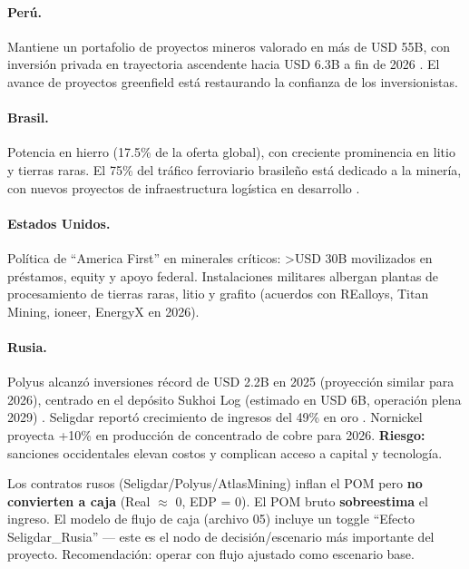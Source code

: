 \paragraph{Perú.} Mantiene un portafolio de proyectos mineros valorado en más de USD 55B, con inversión privada en trayectoria ascendente hacia USD 6.3B a fin de 2026 \cite{andina2026peru}. El avance de proyectos greenfield está restaurando la confianza de los inversionistas.

\paragraph{Brasil.} Potencia en hierro (17.5\% de la oferta global), con creciente prominencia en litio y tierras raras. El 75\% del tráfico ferroviario brasileño está dedicado a la minería, con nuevos proyectos de infraestructura logística en desarrollo \cite{bnamericas2026}.

\paragraph{Estados Unidos.} Política de ``America First'' en minerales críticos: >USD 30B movilizados en préstamos, equity y apoyo federal. Instalaciones militares albergan plantas de procesamiento de tierras raras, litio y grafito (acuerdos con REalloys, Titan Mining, ioneer, EnergyX en 2026).

\paragraph{Rusia.} Polyus alcanzó inversiones récord de USD 2.2B en 2025 (proyección similar para 2026), centrado en el depósito Sukhoi Log (estimado en USD 6B, operación plena 2029) \cite{polyus2025}. Seligdar reportó crecimiento de ingresos del 49\% en oro \cite{seligdar2025}. Nornickel proyecta +10\% en producción de concentrado de cobre para 2026. \textbf{Riesgo:} sanciones occidentales elevan costos y complican acceso a capital y tecnología.

\begin{riskbox}
Los contratos rusos (Seligdar/Polyus/AtlasMining) inflan el POM pero \textbf{no convierten a caja} (Real $\approx$ 0, EDP = 0). El POM bruto \textbf{sobreestima} el ingreso. El modelo de flujo de caja (archivo 05) incluye un toggle ``Efecto Seligdar\_Rusia'' — este es el nodo de decisión/escenario más importante del proyecto. Recomendación: operar con flujo ajustado como escenario base.
\end{riskbox}
